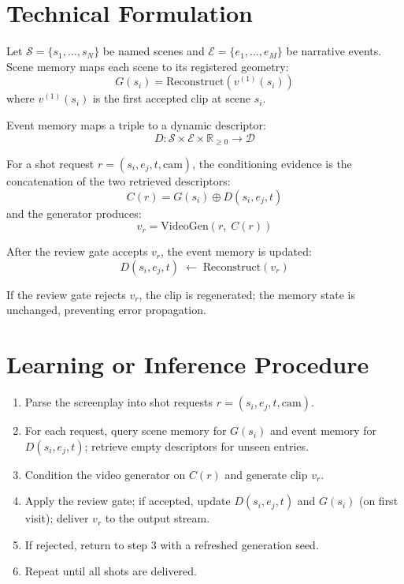 \documentclass[10pt,twocolumn]{article}
\begin{document}
\section{Technical Formulation}

Let $\mathcal{S} = \{s_1, \ldots, s_N\}$ be named scenes and
$\mathcal{E} = \{e_1, \ldots, e_M\}$ be narrative events. Scene memory maps
each scene to its registered geometry:
\[
  G(s_i) = \mathrm{Reconstruct}\!\left(v^{(1)}(s_i)\right)
\]
where $v^{(1)}(s_i)$ is the first accepted clip at scene $s_i$.

Event memory maps a triple to a dynamic descriptor:
\[
  D: \mathcal{S} \times \mathcal{E} \times \mathbb{R}_{\geq 0} \to \mathcal{D}
\]

For a shot request $r = (s_i, e_j, t, \mathrm{cam})$, the conditioning evidence
is the concatenation of the two retrieved descriptors:
\[
  C(r) = G(s_i) \oplus D(s_i, e_j, t)
\]
and the generator produces:
\[
  v_r = \mathrm{VideoGen}(r,\; C(r))
\]

After the review gate accepts $v_r$, the event memory is updated:
\[
  D(s_i, e_j, t) \;\leftarrow\; \mathrm{Reconstruct}(v_r)
\]

If the review gate rejects $v_r$, the clip is regenerated; the memory state
is unchanged, preventing error propagation.

\section{Learning or Inference Procedure}

\begin{enumerate}[itemsep=2pt,parsep=0pt]
  \item Parse the screenplay into shot requests $r = (s_i, e_j, t, \mathrm{cam})$.
  \item For each request, query scene memory for $G(s_i)$ and event memory for
    $D(s_i, e_j, t)$; retrieve empty descriptors for unseen entries.
  \item Condition the video generator on $C(r)$ and generate clip $v_r$.
  \item Apply the review gate; if accepted, update $D(s_i, e_j, t)$ and
    $G(s_i)$ (on first visit); deliver $v_r$ to the output stream.
  \item If rejected, return to step 3 with a refreshed generation seed.
  \item Repeat until all shots are delivered.
\end{enumerate}
\end{document}
